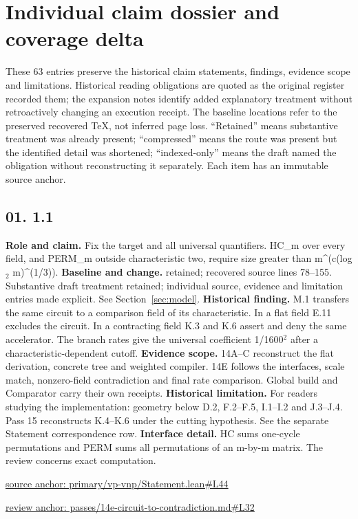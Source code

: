 \documentclass[11pt,letterpaper]{article}
\theoremstyle{definition}\newtheorem{definition}[theorem]{Definition}\newtheorem{example}[theorem]{Example}
\theoremstyle{remark}\newtheorem{remark}[theorem]{Remark}
\begin{document}
\section{Individual claim dossier and coverage delta}\label{app:dossier}
These 63 entries preserve the historical claim statements, findings, evidence scope and limitations. Historical reading obligations are quoted as the original register recorded them; the expansion notes identify added explanatory treatment without retroactively changing an execution receipt. The baseline locations refer to the preserved recovered TeX, not inferred page loss. ``Retained'' means substantive treatment was already present; ``compressed'' means the route was present but the identified detail was shortened; ``indexed-only'' means the draft named the obligation without reconstructing it separately. Each item has an immutable source anchor.
\goodbreak
\subsection*{01. 1.1}
\textbf{Role and claim.} Fix the target and all universal quantifiers. HC\_m over every field, and PERM\_m outside characteristic two, require size greater than m\textasciicircum{}(c(log\ensuremath{{}_2} m)\textasciicircum{}(1/3)).
\textbf{Baseline and change.} retained; recovered source lines 78--155. Substantive draft treatment retained; individual source, evidence and limitation entries made explicit. See Section~\ref{sec:model}.
\textbf{Historical finding.} M.1 transfers the same circuit to a comparison field of its characteristic. In a flat field E.11 excludes the circuit. In a contracting field K.3 and K.6 assert and deny the same accelerator. The branch rates give the universal coefficient 1/1600\ensuremath{{}^2} after a characteristic-dependent cutoff.
\textbf{Evidence scope.} 14A–C reconstruct the flat derivation, concrete tree and weighted compiler. 14E follows the interfaces, scale match, nonzero-field contradiction and final rate comparison. Global build and Comparator carry their own receipts.
\textbf{Historical limitation.} For readers studying the implementation: geometry below D.2, F.2–F.5, I.1–I.2 and J.3–J.4. Pass 15 reconstructs K.4–K.6 under the cutting hypothesis. See the separate Statement correspondence row.
\textbf{Interface detail.} HC sums one-cycle permutations and PERM sums all permutations of an m-by-m matrix. The review concerns exact computation.
\par\href{https://github.com/nousentllc/VP-VNP-Review/blob/8a7976933b6b2b4ffda1ad3a0dfb5fc6b6f023e8/primary/vp-vnp/Statement.lean\#L44}{source anchor: primary/vp-vnp/Statement.lean\#L44}
\par\href{https://github.com/nousentllc/VP-VNP-Review/blob/8a7976933b6b2b4ffda1ad3a0dfb5fc6b6f023e8/passes/14e-circuit-to-contradiction.md\#L32}{review anchor: passes/14e-circuit-to-contradiction.md\#L32}
\goodbreak
\end{document}
